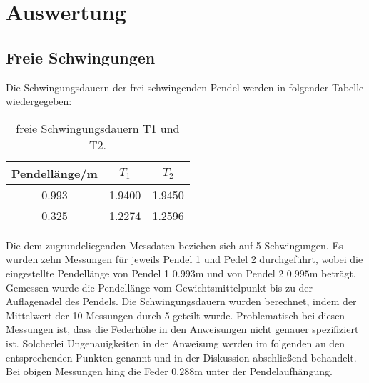 \section{Auswertung}
  \subsection{Freie Schwingungen}
    Die Schwingungsdauern der frei schwingenden Pendel werden in folgender Tabelle wiedergegeben:
      \begin{table}
        \centering
          \caption{freie Schwingungsdauern T1 und T2.}
          \label{tab:aufgabe1}
          \begin{tabular}{S S S}
            \toprule
            {Pendellänge/m}  & {$T_{1}$} & {$T_{2}$} \\
                        &   1.9400  &   1.9450 \\
            0.325            &   1.2274  &   1.2596 \\
            \bottomrule
          \end{tabular}
        \end{table}
        \newpage
    Die dem zugrundeliegenden Messdaten beziehen sich auf 5 Schwingungen. Es wurden zehn Messungen für jeweils Pendel 1
    und Pedel 2 durchgeführt, wobei die eingestellte Pendellänge von Pendel 1 $0.993$m und von Pendel 2 $0.995$m beträgt.
    Gemessen wurde die Pendellänge vom Gewichtsmittelpunkt bis zu der Auflagenadel des Pendels. Die  Schwingungsdauern
    wurden berechnet, indem der Mittelwert der 10 Messungen durch 5 geteilt wurde.
    Problematisch bei diesen Messungen ist, dass die Federhöhe in den Anweisungen nicht genauer spezifiziert ist.
    Solcherlei Ungenauigkeiten in der Anweisung werden im folgenden an den entsprechenden Punkten genannt und in der
    Diskussion abschließend behandelt. Bei obigen Messungen hing die Feder $0.288$m unter der Pendelaufhängung.
